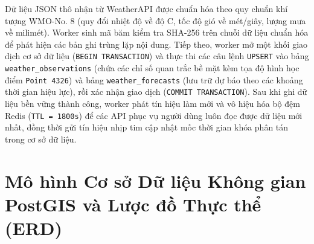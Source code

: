 \begin{itemize}
    Dữ liệu JSON thô nhận từ WeatherAPI được chuẩn hóa theo quy chuẩn khí tượng WMO-No. 8 (quy đổi nhiệt độ về độ C, tốc độ gió về mét/giây, lượng mưa về milimét). Worker sinh mã băm kiểm tra SHA-256 trên chuỗi dữ liệu chuẩn hóa để phát hiện các bản ghi trùng lặp nội dung. Tiếp theo, worker mở một khối giao dịch cơ sở dữ liệu (\texttt{BEGIN TRANSACTION}) và thực thi các câu lệnh \texttt{UPSERT} vào bảng \texttt{weather\_observations} (chứa các chỉ số quan trắc bề mặt kèm tọa độ hình học điểm \texttt{Point 4326}) và bảng \texttt{weather\_forecasts} (lưu trữ dự báo theo các khoảng thời gian hiệu lực), rồi xác nhận giao dịch (\texttt{COMMIT TRANSACTION}). Sau khi ghi dữ liệu bền vững thành công, worker phát tín hiệu làm mới và vô hiệu hóa bộ đệm Redis (\texttt{TTL = 1800s}) để các API phục vụ người dùng luôn đọc được dữ liệu mới nhất, đồng thời gửi tín hiệu nhịp tim cập nhật mốc thời gian khóa phân tán trong cơ sở dữ liệu.
\end{itemize}

\section{Mô hình Cơ sở Dữ liệu Không gian PostGIS và Lược đồ Thực thể (ERD)}
\label{sec:postgis_erd_schema}

